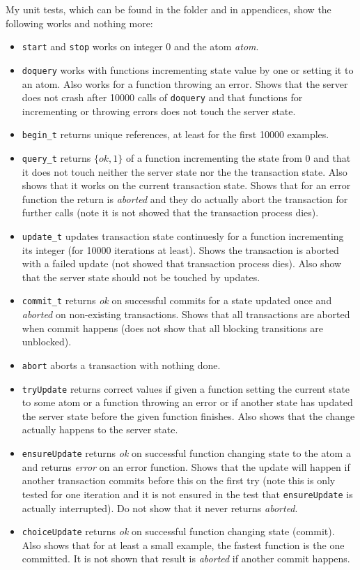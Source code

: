\documentclass[a4paper, 10pt]{article}
\begin{document}
My unit tests, which can be found in the folder and in appendices, show the following works and nothing more:
\begin{itemize}
  \item \texttt{start} and \texttt{stop} works on integer 0 and the atom \textit{atom}.
  \item \texttt{doquery} works with functions incrementing state value by one or setting it to an atom. Also works for a function throwing an error. Shows that the server does not crash after 10000 calls of \texttt{doquery} and that functions for incrementing or throwing errors does not touch the server state.
  \item \texttt{begin\_t} returns unique references, at least for the first 10000 examples.
  \item \texttt{query\_t} returns $\{ok, 1\}$ of a function incrementing the state from 0 and that it does not touch neither the server state nor the the transaction state. Also shows that it works on the current transaction state. Shows that for an error function the return is \textit{aborted} and they do actually abort the transaction for further calls (note it is not showed that the transaction process dies).
  \item \texttt{update\_t} updates transaction state continuesly for a function incrementing its integer (for 10000 iterations at least). Shows the transaction is aborted with a failed update (not showed that transaction process dies). Also show that the server state should not be touched by updates.
  \item \texttt{commit\_t} returns \textit{ok} on successful commits for a state updated once and \textit{aborted} on non-existing transactions. Shows that all transactions are aborted when commit happens (does not show that all blocking transitions are unblocked).
  \item \texttt{abort} aborts a transaction with nothing done.
  \item \texttt{tryUpdate} returns correct values if given a function setting the current state to some atom or a function throwing an error or if another state has updated the server state before the given function finishes. Also shows that the change actually happens to the server state.
  \item \texttt{ensureUpdate} returns \textit{ok} on successful function changing state to the atom a and returns \textit{error} on an error function. Shows that the update will happen if another transaction commits before this on the first try (note this is only tested for one iteration and it is not ensured in the test that \texttt{ensureUpdate} is actually interrupted). Do not show that it never returns \textit{aborted}.
  \item \texttt{choiceUpdate} returns \textit{ok} on successful function changing state (commit). Also shows that for at least a small example, the fastest function is the one committed. It is not shown that result is \textit{aborted} if another commit happens.
\end{itemize}
\end{document}
